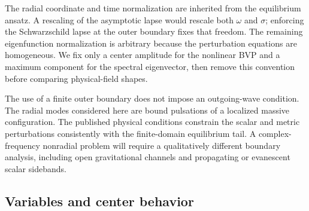\documentclass[aps,prd,preprint,onecolumn,nofootinbib,superscriptaddress,showkeys]{revtex4-2}
\begin{document}
The radial coordinate and time normalization are inherited from the equilibrium ansatz. A rescaling of the asymptotic lapse would rescale both $\omega$ and $\sigma$; enforcing the Schwarzschild lapse at the outer boundary fixes that freedom. The remaining eigenfunction normalization is arbitrary because the perturbation equations are homogeneous. We fix only a center amplitude for the nonlinear BVP and a maximum component for the spectral eigenvector, then remove this convention before comparing physical-field shapes.

The use of a finite outer boundary does not impose an outgoing-wave condition. The radial modes considered here are bound pulsations of a localized massive configuration. The published physical conditions constrain the scalar and metric perturbations consistently with the finite-domain equilibrium tail. A complex-frequency nonradial problem will require a qualitatively different boundary analysis, including open gravitational channels and propagating or evanescent scalar sidebands.

\subsection{Variables and center behavior}
\end{document}
